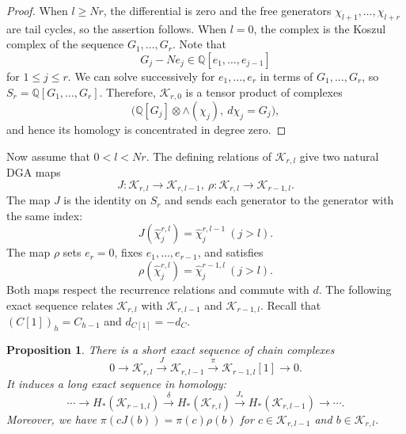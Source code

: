 \documentclass[reqno]{amsart}
\newtheorem{prop}[thm]{Proposition}
\theoremstyle{definition}
\theoremstyle{remark}
\newcommand{\QQ}{\mathbb{Q}}
\newcommand{\cak}{\mathcal{K}}
\newcommand{\whc}{\widehat{\chi}}
\begin{document}
\begin{proof}
When $l\ge Nr$, the differential is zero and the free generators $\chi_{l+1},\dots,\chi_{l+r}$ are tail cycles, so the assertion follows.
When $l=0$, the complex is the Koszul complex of the sequence $G_1,\dots,G_r$. Note that
\[G_j-Ne_j\in\QQ[e_1,\dots,e_{j-1}]\]
for $1\le j\le r$. We can solve successively for $e_1,\dots,e_r$ in terms of $G_1,\dots,G_r$, so $S_r=\QQ[G_1,\dots,G_r]$. Therefore, $\cak_{r,0}$ is a tensor product of complexes
\[\bigl(\QQ[G_j]\otimes\wedge(\chi_j),\ d\chi_j=G_j\bigr),\]
and hence its homology is concentrated in degree zero.
\end{proof}

Now assume that $0<l<Nr$. The defining relations of $\cak_{r,l}$ give two natural DGA maps
\[J\colon\cak_{r,l}\to\cak_{r,l-1},\ \rho\colon\cak_{r,l}\to\cak_{r-1,l}.\]
The map $J$ is the identity on $S_r$ and sends each generator to the generator with the same index:
\begin{equation}\label{eqn:J preserves tail classes}
J(\whc_j^{r,l})=\whc_j^{r,l-1}\ (j>l).
\end{equation}
The map $\rho$ sets $e_r=0$, fixes $e_1,\dots,e_{r-1}$, and satisfies
\begin{equation}\label{eqn:rho preserves tail classes}
\rho(\whc_j^{r,l})=\whc_j^{r-1,l}\ (j>l).
\end{equation}
Both maps respect the recurrence relations and commute with $d$. The following exact sequence relates $\cak_{r,l}$ with $\cak_{r,l-1}$ and $\cak_{r-1,l}$. Recall that $(C[1])_h=C_{h-1}$ and $d_{C[1]}=-d_C$.

\begin{prop}\label{prop:exact sequence for Krl}
There is a short exact sequence of chain complexes
\[0\to\cak_{r,l}\xrightarrow{J}\cak_{r,l-1}\xrightarrow{\pi}\cak_{r-1,l}[1]\to0.\]
It induces a long exact sequence in homology:
\begin{equation}\label{eqn:long exact sequence in homology}
\cdots\to H_*(\cak_{r-1,l})\xrightarrow{\delta}H_*(\cak_{r,l})\xrightarrow{J_*}H_*(\cak_{r,l-1})\to\cdots.
\end{equation}
Moreover, we have $\pi(cJ(b))=\pi(c)\rho(b)$ for $c\in\cak_{r,l-1}$ and $b\in\cak_{r,l}$.
\end{prop}
\end{document}
